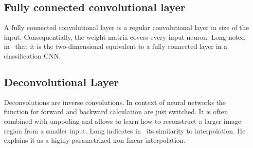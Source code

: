 \subsection{Fully connected convolutional layer}
A fully connected convolutional layer is a regular convolutional layer in size
of the input. Consequentially, the weight matrix covers every input neuron. Long
noted in~\cite{long2014fully} that it is the two-dimensional equivalent to a
fully connected layer in a classification \gls{CNN}.

\subsection{Deconvolutional Layer}
Deconvolutions are inverse convolutions. In context of neural networks the
function for forward and backward calculation are just switched. It is often
combined with unpooling and allows to learn how to reconstruct a larger image
region from a smaller input. Long indicates in~\cite{long2014fully} its
similarity to interpolation. He explains it as a highly parametrized non-linear
interpolation.
